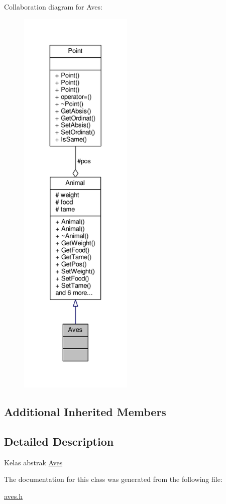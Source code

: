 Collaboration diagram for Aves\+:
\nopagebreak
\begin{figure}[H]
\begin{center}
\leavevmode
\includegraphics[height=550pt]{classAves__coll__graph}
\end{center}
\end{figure}
\subsection*{Additional Inherited Members}


\subsection{Detailed Description}
Kelas abstrak \hyperlink{classAves}{Aves} 

The documentation for this class was generated from the following file\+:\begin{DoxyCompactItemize}
\item 
\hyperlink{aves_8h}{aves.\+h}\end{DoxyCompactItemize}
